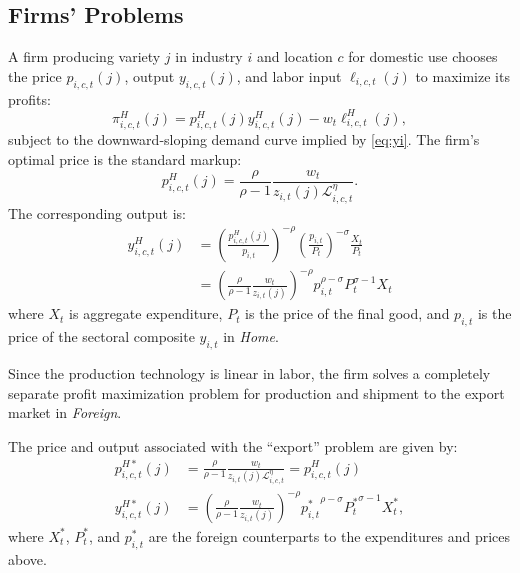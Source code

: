 \documentclass[onehalfspacing,11pt]{article}
\begin{document}
\subsection{Firms' Problems}\label{sec:problems}
A firm producing variety $j$ in industry $i$ and location $c$ for domestic use chooses the price $p_{i,c,t}(j)$, output $y_{i,c,t}(j)$, and
labor input $\ell_{i,c,t}(j)$ to maximize its profits: 
\begin{equation}
\pi_{i,c,t}^H(j) = p_{i,c,t}^H(j) y_{i,c,t}^H(j) - w_{t}\ell_{i,c,t}^H(j),  \label{eq:profit_max_static}
\end{equation}%
subject to the downward-sloping demand curve implied by \eqref{eq:yi}. The firm's optimal price is the standard
markup: 
\begin{equation}
p_{i,c,t}^H(j)=\frac{\rho }{\rho -1}\frac{w_{t}}{z_{i,t}(j) \mathcal{L}_{i,c,t}^\eta}.  \label{eq:monopolist_price}
\end{equation}%
The corresponding output is: 
\begin{align}
y_{i,c,t}^H(j) & =\left( \frac{p_{i,c,t}^H(j)}{p_{i,t}}\right) ^{-\rho} \left( \frac{p_{i,t}}{P_t} \right)^{-\sigma} \frac{X_{t}}{P_{t}} \nonumber \\
& =\left( \frac{\rho }{\rho -1}\frac{w_{t}}{z_{i,t}(j)}\right) ^{-\rho } p_{i,t}^{\rho-\sigma} P_t^{\sigma-1} X_t
\label{eq:monopolist_output}
\end{align}%
where $X_{t}$ is aggregate expenditure, $P_{t}$ is the price of the final good, and $p_{i,t}$ is the price of the sectoral composite $y_{i,t}$ in {\it Home}.

Since the production technology is linear in labor, the firm solves a completely separate profit maximization problem for production and shipment to the export market in {\it Foreign}.

The price and output associated with the ``export'' problem are given by:
\begin{align}
\label{}
p_{i,c,t}^{H*}(j) & =\frac{\rho }{\rho -1}\frac{w_{t}}{z_{i,t}(j) \mathcal{L}_{i,c,t}^\eta} = p_{i,c,t}^{H}(j)  \\
y_{i,c,t}^{H*}(j) &  =\left( \frac{\rho }{\rho -1}\frac{w_{t}}{z_{i,t}(j)} \right) ^{-\rho } {p_{i,t}^*}^{\rho-\sigma} {P_t^*}^{\sigma-1} X_t^*,
\end{align}
where $X_{t}^*$, $P_{t}^*$, and $p_{i,t}^*$ are the foreign counterparts to the expenditures and prices above.
\end{document}
